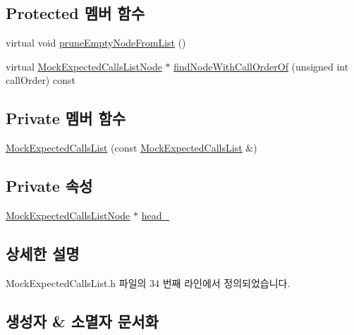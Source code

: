 \subsection*{Protected 멤버 함수}
\begin{DoxyCompactItemize}
\item 
virtual void \hyperlink{class_mock_expected_calls_list_aeb4c1dd9901800365e942770b132c94b}{prune\+Empty\+Node\+From\+List} ()
\item 
virtual \hyperlink{class_mock_expected_calls_list_1_1_mock_expected_calls_list_node}{Mock\+Expected\+Calls\+List\+Node} $\ast$ \hyperlink{class_mock_expected_calls_list_ac9399ef4ecb1468ef6e350629bdecc39}{find\+Node\+With\+Call\+Order\+Of} (unsigned int call\+Order) const 
\end{DoxyCompactItemize}
\subsection*{Private 멤버 함수}
\begin{DoxyCompactItemize}
\item 
\hyperlink{class_mock_expected_calls_list_aa968b44e92114ae1ac7fff4d7e360ee2}{Mock\+Expected\+Calls\+List} (const \hyperlink{class_mock_expected_calls_list}{Mock\+Expected\+Calls\+List} \&)
\end{DoxyCompactItemize}
\subsection*{Private 속성}
\begin{DoxyCompactItemize}
\item 
\hyperlink{class_mock_expected_calls_list_1_1_mock_expected_calls_list_node}{Mock\+Expected\+Calls\+List\+Node} $\ast$ \hyperlink{class_mock_expected_calls_list_a18290c3c0a206882dd8e0d9f446e2fe6}{head\+\_\+}
\end{DoxyCompactItemize}


\subsection{상세한 설명}


Mock\+Expected\+Calls\+List.\+h 파일의 34 번째 라인에서 정의되었습니다.



\subsection{생성자 \& 소멸자 문서화}
